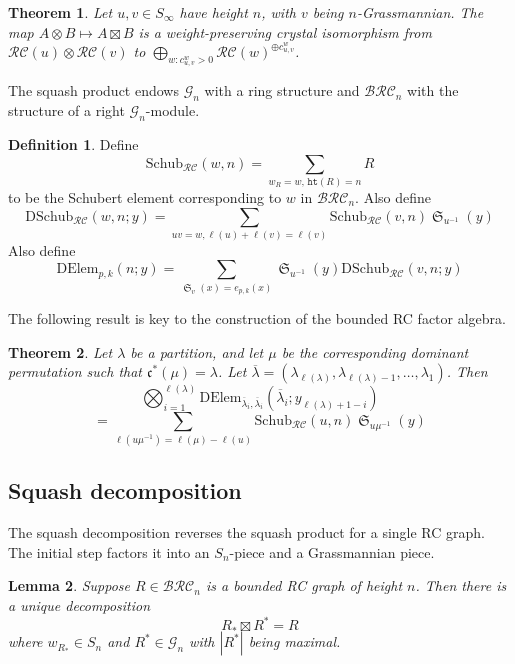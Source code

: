 \documentclass{amsart}
\newtheorem{lemma}{Lemma}[section]
\newtheorem{theorem}{Theorem}[section]
\theoremstyle{definition}
\newtheorem{definition}[lemma]{Definition}
\theoremstyle{remark}
\numberwithin{equation}{section}
\DeclareMathOperator{\sch}{\mathfrak{S}}
\newcommand{\BRC}{\mathcal{BRC}}
\newcommand{\RC}{\mathcal{RC}}
\newcommand{\grass}{\mathcal{G}}
\newcommand{\wof}[1]{w_{#1}}
\newcommand{\hr}{\mathtt{ht}}
\newcommand{\code}{\mathfrak{c}}
\begin{document}
\begin{theorem}\label{theorem:squash-crystal}
Let $u, v \in S_\infty$ have height $n$, with $v$ being $n$-Grassmannian.  The map $A \otimes B \mapsto A \boxtimes B$ is a weight-preserving crystal isomorphism from $\RC(u) \otimes \RC(v)$ to $\bigoplus_{w : c_{u,v}^w > 0} \RC(w)^{\oplus c_{u,v}^w}$.
\end{theorem}

The squash product endows $\grass_n$ with a ring structure and $\BRC_n$ with the structure of a right $\grass_n$-module.

\begin{definition}
Define 
$$\mathrm{Schub}_{\RC}(w, n) = \sum_{\wof{R} = w,\, \hr(R) = n} R$$ 
to be the Schubert element corresponding to $w$ in $\BRC_n$. Also define
$$\mathrm{DSchub}_{\RC}(w, n;y) = \sum_{uv = w, \ell(u) + \ell(v)=\ell(v)} \mathrm{Schub}_{\RC}(v, n)\sch_{u^{-1}}(y)$$ 
Also define
$$\mathrm{DElem}_{p,k}(n;y) = \sum_{\sch_v(x)=e_{p,k}(x)} \sch_{u^{-1}}(y)\mathrm{DSchub}_{\RC}(v, n; y)$$
\end{definition}

The following result is key to the construction of the bounded RC factor algebra.

\begin{theorem}
Let $\lambda$ be a partition, and let $\mu$ be the corresponding dominant permutation such that $\code^*(\mu)=\lambda$. Let $\overline{\lambda}=(\lambda_{\ell(\lambda)}, \lambda_{\ell(\lambda)-1},\ldots, \lambda_1)$. Then
$$\bigotimes_{i = 1}^{\ell(\lambda)}\mathrm{DElem}_{\overline{\lambda}_{i}, \overline{\lambda}_{i}}(\overline{\lambda}_{i};y_{\ell(\lambda) + 1 - i})$$
$$=\sum_{\ell(u\mu^{-1}) = \ell(\mu) - \ell(u)} \mathrm{Schub}_{\RC}(u, n)\sch_{u\mu^{-1}}(y)$$
\end{theorem}

\subsection{Squash decomposition}

The squash decomposition reverses the squash product for a single RC graph. The initial step factors it into an $S_n$-piece and a Grassmannian piece.

\begin{lemma}
Suppose $R \in \BRC_n$ is a bounded RC graph of height $n$. Then there is a unique decomposition 
$$R_*\boxtimes R^*=R$$
where $\wof{R_*} \in S_n$ and $R^* \in \grass_n$ with $|R^*|$ being maximal.
\end{lemma}
\end{document}
